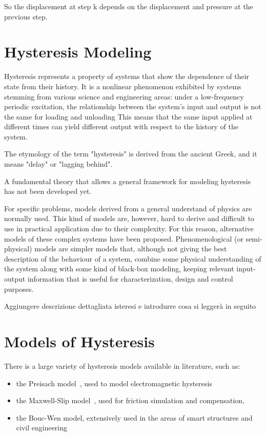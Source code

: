 So the displacement at step k depends on the displacement and pressure
at the previous step.

\section{Hysteresis Modeling}

Hysteresis represents a property of systems that show
the dependence of their state from their history.
It is a nonlinear phenomenon exhibited by systems stemming
from various science and engineering areas: under a low-frequency
periodic excitation, the relationship between the system’s input and
output is not the same for loading and unloading
This means that the same input applied at different times can yield
different output with respect to the history of the system.

The etymology of the term "hysteresis" is derived from the ancient Greek,
and it means "delay" or "lagging behind".

A fundamental theory that allows a general framework
for modeling hysteresis has not been developed yet.

For specific problems, models derived from a general understand of physics
are normally used. This kind of models are, however, hard to derive and
difficult to use in practical application due to their complexity.
For this reason, alternative models of these complex systems have been proposed.
Phenomenological (or semi-physical) models are simpler models that,
although not giving the best description of the behaviour of a system,
combine some physical understanding of the system along with
some kind of black-box modeling, keeping relevant
input-output information that is useful for characterization,
design and control purposes.

{\color{red}Aggiungere descrizione dettagliata isteresi e introdurre cosa si leggerà in seguito}

\section{Models of Hysteresis}

There is a large variety of hysteresis models available in literature,
such as:

\begin{itemize}[noitemsep]
	\item the Preisach model~\cite{preisach}, used to model electromagnetic hysteresis
	\item the Maxwell-Slip model~\cite{maxwell-slip}, used for friction simulation and compensation,
	\item the Bouc-Wen model, extensively used in the areas of smart structures
	and civil engineering~\cite{bouc_wen}
\end{itemize}

